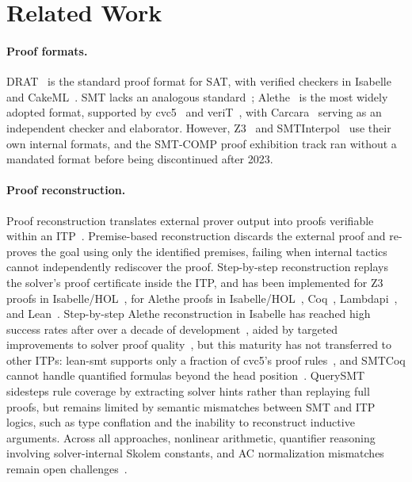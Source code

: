 \section{Related Work}

\paragraph{Proof formats.}
DRAT~\cite{wetzler2014drattrim} is the standard proof format for SAT, with verified checkers in Isabelle~\cite{lammich2019efficient} and CakeML~\cite{tan2021cakelpr}.
SMT lacks an analogous standard~\cite{barbosa2023generating}; Alethe~\cite{schurr2021alethe} is the most widely adopted format, supported by cvc5~\cite{barbosa2022cvc, barbosa2022flexible} and veriT~\cite{bouton2009verit}, with Carcara~\cite{andreotti2023carcara} serving as an independent checker and elaborator.
However, Z3~\cite{demoura2008z} and SMTInterpol~\cite{christ2012smtinterpol} use their own internal formats, and the SMT-COMP proof exhibition track ran without a mandated format before being discontinued after 2023.

\paragraph{Proof reconstruction.}
Proof reconstruction translates external prover output into proofs verifiable within an ITP~\cite{blanchette2016hammering}.
Premise-based reconstruction discards the external proof and re-proves the goal using only the identified premises, failing when internal tactics cannot independently rediscover the proof.
Step-by-step reconstruction replays the solver's proof certificate inside the ITP, and has been implemented for Z3 proofs in Isabelle/HOL~\cite{bhme2010fast}, for Alethe proofs in Isabelle/HOL~\cite{fleury2019reconstructing, schurr2021reliable, lachnitt2025improving}, Coq~\cite{ekici2017smtcoq, armand2011a}, Lambdapi~\cite{coltellacci2026reconstruction}, and Lean~\cite{mohamed2025leansmt}.
Step-by-step Alethe reconstruction in Isabelle has reached high success rates after over a decade of development~\cite{lachnitt2025improving}, aided by targeted improvements to solver proof quality~\cite{barbosa2019better}, but this maturity has not transferred to other ITPs: lean-smt supports only a fraction of cvc5's proof rules~\cite{mohamed2025leansmt}, and SMTCoq cannot handle quantified formulas beyond the head position~\cite{barbosa2023challenges}.
QuerySMT~\cite{clune2026hintbased} sidesteps rule coverage by extracting solver hints rather than replaying full proofs, but remains limited by semantic mismatches between SMT and ITP logics, such as type conflation and the inability to reconstruct inductive arguments.
Across all approaches, nonlinear arithmetic, quantifier reasoning involving solver-internal Skolem constants, and AC normalization mismatches remain open challenges~\cite{barbosa2023challenges}.

